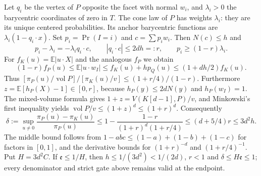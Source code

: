 \documentclass[11pt]{article}
\newcommand{\vol}{\operatorname{vol}}
\newcommand{\ee}{\mathfrak e}
\newcommand{\E}{\mathbb E}
\begin{document}
Let $q_i$ be the vertex of $P$ opposite the facet with normal $w_i$, and
$\lambda_i>0$ the barycentric coordinates of zero in $T$. The cone law of $P$
has weights $\lambda_i$: they are its unique centered probabilities. Its
anchor barycentric functions are $\lambda_i(1-q_i\cdot x)$.
Set $p_i=\Pr(I=i)$ and $c=\sum p_iw_i$. Then $N(c)\le h$ and
\[
p_i-\lambda_i=-\lambda_iq_i\cdot c,\qquad
|q_i\cdot c|\le2dh=:r,\qquad p_i\ge(1-r)\lambda_i.
\]
For $f_K(u)=\E|u\cdot X|$ and the analogous $f_P$ we obtain
\[
(1-r)f_P(u)\le\E|u\cdot w_I|
\le f_K(u)+h p_Q(u)\le(1+dh/2)f_K(u).
\]
Thus $[\pi_P(u)/\vol P]/[\pi_K(u)/v]\le(1+r/4)/(1-r)$.
Furthermore $z=\E[h_P(X)-1]\in[0,r]$, because
$h_P(y)\le2dN(y)$ and $h_P(w_I)=1$. The mixed-volume formula gives
$1+z=V(K[d-1],P)/v$, and Minkowski's first inequality yields
$\vol P/v\le(1+z)^d\le(1+r)^d$. Consequently
\[
\delta:=\sup_{u\ne0}\frac{\pi_P(u)-\pi_K(u)}{\pi_P(u)}
\le1-\frac{1-r}{(1+r)^d(1+r/4)}\le(d+5/4)r\le3d^2h.
\]
The middle bound follows from $1-abc\le(1-a)+(1-b)+(1-c)$ for factors in
$[0,1]$, and the derivative bounds for $(1+r)^{-d}$ and $(1+r/4)^{-1}$.
Put $H=3d^2C$. If $\ee\le1/H$, then
$h\le1/(3d^2)<1/(2d)$, $r<1$ and $\delta\le H\ee\le1$;
every denominator and strict gate above remains valid at the endpoint.
\end{document}
